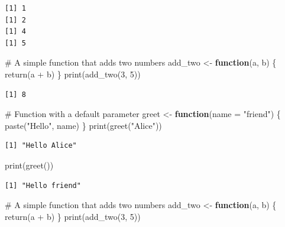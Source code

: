 \documentclass[
  letterpaper,
  DIV=11,
  numbers=noendperiod]{scrartcl}
\newenvironment{Shaded}{\begin{snugshade}}{\end{snugshade}}
\newcommand{\AttributeTok}[1]{\textcolor[rgb]{0.40,0.45,0.13}{#1}}
\newcommand{\CommentTok}[1]{\textcolor[rgb]{0.37,0.37,0.37}{#1}}
\newcommand{\ControlFlowTok}[1]{\textcolor[rgb]{0.00,0.23,0.31}{\textbf{#1}}}
\newcommand{\DecValTok}[1]{\textcolor[rgb]{0.68,0.00,0.00}{#1}}
\newcommand{\FunctionTok}[1]{\textcolor[rgb]{0.28,0.35,0.67}{#1}}
\newcommand{\NormalTok}[1]{\textcolor[rgb]{0.00,0.23,0.31}{#1}}
\newcommand{\OtherTok}[1]{\textcolor[rgb]{0.00,0.23,0.31}{#1}}
\newcommand{\SpecialCharTok}[1]{\textcolor[rgb]{0.37,0.37,0.37}{#1}}
\newcommand{\StringTok}[1]{\textcolor[rgb]{0.13,0.47,0.30}{#1}}
\begin{document}
\begin{verbatim}
[1] 1
[1] 2
[1] 4
[1] 5
\end{verbatim}

\begin{Shaded}
\begin{Highlighting}[]
\CommentTok{\#   A simple function that adds two numbers}
\NormalTok{add\_two }\OtherTok{\textless{}{-}} \ControlFlowTok{function}\NormalTok{(a, b) \{}
  \FunctionTok{return}\NormalTok{(a }\SpecialCharTok{+}\NormalTok{ b)}
\NormalTok{\}}
\FunctionTok{print}\NormalTok{(}\FunctionTok{add\_two}\NormalTok{(}\DecValTok{3}\NormalTok{, }\DecValTok{5}\NormalTok{))}
\end{Highlighting}
\end{Shaded}

\begin{verbatim}
[1] 8
\end{verbatim}

\begin{Shaded}
\begin{Highlighting}[]
\CommentTok{\#   Function with a default parameter}
\NormalTok{greet }\OtherTok{\textless{}{-}} \ControlFlowTok{function}\NormalTok{(}\AttributeTok{name =} \StringTok{"friend"}\NormalTok{) \{}
  \FunctionTok{paste}\NormalTok{(}\StringTok{"Hello"}\NormalTok{, name)}
\NormalTok{\}}
\FunctionTok{print}\NormalTok{(}\FunctionTok{greet}\NormalTok{(}\StringTok{"Alice"}\NormalTok{))}
\end{Highlighting}
\end{Shaded}

\begin{verbatim}
[1] "Hello Alice"
\end{verbatim}

\begin{Shaded}
\begin{Highlighting}[]
\FunctionTok{print}\NormalTok{(}\FunctionTok{greet}\NormalTok{())}
\end{Highlighting}
\end{Shaded}

\begin{verbatim}
[1] "Hello friend"
\end{verbatim}

\begin{Shaded}
\begin{Highlighting}[]
\CommentTok{\#   A simple function that adds two numbers}
\NormalTok{add\_two }\OtherTok{\textless{}{-}} \ControlFlowTok{function}\NormalTok{(a, b) \{}
  \FunctionTok{return}\NormalTok{(a }\SpecialCharTok{+}\NormalTok{ b)}
\NormalTok{\}}
\FunctionTok{print}\NormalTok{(}\FunctionTok{add\_two}\NormalTok{(}\DecValTok{3}\NormalTok{, }\DecValTok{5}\NormalTok{))}
\end{Highlighting}
\end{Shaded}
\end{document}
